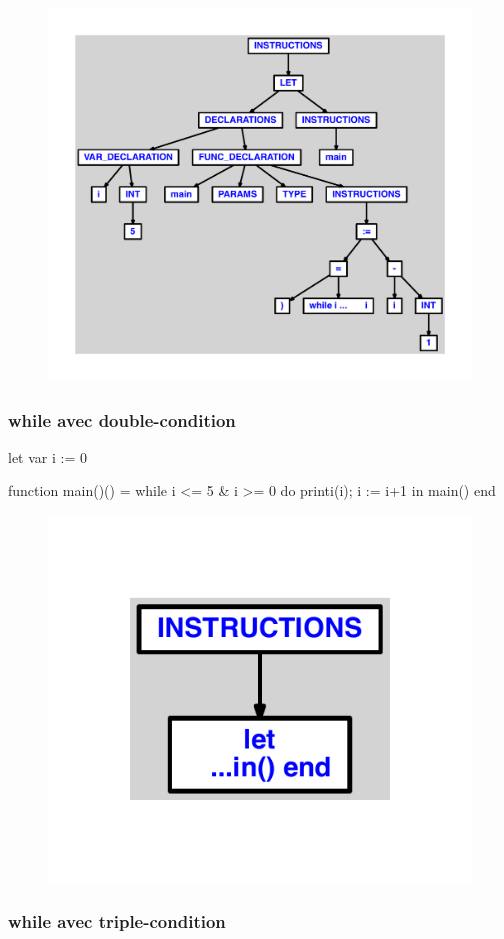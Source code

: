 \documentclass{article}
\begin{document}
\begin{figure}[H]\centering\includegraphics[max width=\textwidth]{ast/ast_321.pdf}\end{figure}\subsubsection{while avec double-condition}
\begin{verbatimtab}
let
	var i := 0

	function main()() =
		while i <= 5 & i >= 0 do
			printi(i);
			i := i+1
in main() end
\end{verbatimtab}
\begin{figure}[H]\centering\includegraphics[max width=\textwidth]{ast/ast_322.pdf}\end{figure}\subsubsection{while avec triple-condition}
\end{document}
